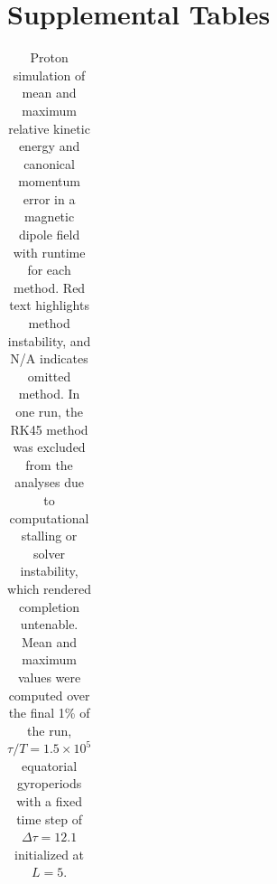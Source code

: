 \documentclass{article}
\begin{document}
\section{Supplemental Tables}\label{appendix:tables}
\renewcommand{\thetable}{B.\arabic{table}}

\begin{table}[H]
\setlength{\extrarowheight}{2pt}
\centering
\caption{Proton simulation of mean and maximum relative kinetic energy and canonical momentum error in a magnetic dipole field with runtime for each method. Red text highlights method instability, and N/A indicates omitted method. In one run, the RK45 method was excluded from the analyses due to computational stalling or solver instability, which rendered completion untenable. Mean and maximum values were computed over the final 1\% of the run, $\tau/T=1.5\times 10^5$ equatorial gyroperiods with a fixed time step of $\Delta\tau=12.1$ initialized at $L=5$.}
\label{tab:proton_energy_results}
\setlength{\tabcolsep}{4pt}  
\begin{tabular}{|c|c|c|c|c|c|}
\hline


\end{tabular}
\end{table}
\end{document}
